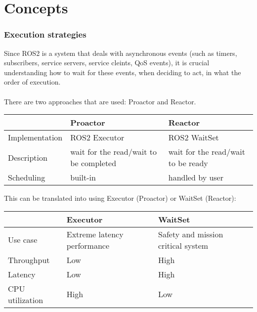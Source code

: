


\part{Concepts}


\section*{Execution strategies}
  Since ROS2 is a system that deals with asynchronous events (such as timers, subscribers, service servers, service cleints, QoS events), it is crucial understanding how to wait for these events, when deciding to act, in what the order of execution. 
  \\
  \\
  There are two approaches that are used: Proactor and Reactor.

  \begin{table}[htbp]
    \centering
    \begin{tabularx}{\textwidth}[t]{|l|X|X|}
      \hline
      & \centering Proactor & \centering\arraybackslash Reactor \\
      \hline
      Implementation  & ROS2 Executor & ROS2 WaitSet \\
      \hline
      Description     & wait for the read/wait to be completed & wait for the read/wait to be ready \\
      \hline
      Scheduling      & built-in & handled by user \\
      \hline
    \end{tabularx}
  \end{table}

  This can be translated into using Executor (Proactor) or WaitSet (Reactor):

  \begin{table}[htbp]
    \centering
    \begin{tabularx}{\textwidth}[t]{|l|X|X|}
      \hline
      & \centering Executor & \centering\arraybackslash WaitSet \\
      \hline
      Use case & Extreme latency performance & Safety and mission critical system \\
      \hline
      Throughput & Low & High \\
      \hline
      Latency & Low & High \\
      \hline
      CPU utilization & High & Low \\
      \hline
    \end{tabularx}
  \end{table}




